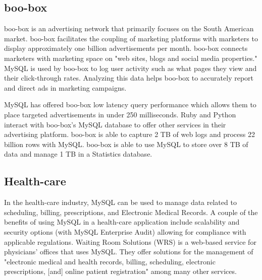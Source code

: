 \documentclass[9pt,twocolumn,twoside]{styles/osajnl}
\begin{document}
\subsection{boo-box}
boo-box is an advertising network that primarily focuses on the South
American market. \cite{boo} boo-box facilitates the coupling of
marketing platforms with marketers to display approximately one
billion advertisements per month. \cite{boo} boo-box connects
marketers with marketing space on "web sites, blogs and social media
properties." \cite{boo} MySQL is used by boo-box to log user activity
such as what pages they view and their click-through rates. \cite{boo}
Analyzing this data helps boo-box to accurately report and direct ads
in marketing campaigns. \cite{boo}

MySQL has offered boo-box low latency query performance which allows
them to place targeted advertisements in under 250
milliseconds. \cite{boo} Ruby and Python interact with boo-box's MySQL
database to offer other services in their advertising
platform. \cite{boo} boo-box is able to capture 2 TB of web logs and
process 22 billion rows with MySQL. \cite{boo} boo-box is able to use
MySQL to store over 8 TB of data and manage 1 TB in a Statistics
database. \cite{boo}

\subsection{Health-care}
In the health-care industry, MySQL can be used to manage data related
to scheduling, billing, prescriptions, and Electronic Medical
Records. \cite{health} A couple of the benefits of using MySQL in a
health-care application include scalability and security options (with
MySQL Enterprise Audit) allowing for compliance with applicable
regulations. \cite{health} Waiting Room Solutions (WRS) is a web-based
service for physicians' offices that uses MySQL. \cite{health} They
offer solutions for the management of "electronic medical and health
records, billing, scheduling, electronic prescriptions, [and] online
patient registration" among many other services. \cite{health}
\end{document}
